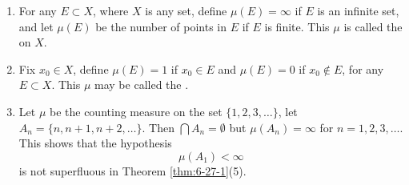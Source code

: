 \documentclass[../main.tex]{subfiles}
\begin{document}
\begin{example}{}{}
    \begin{enumerate}
\item For any $E \subset X$, where $X$ is any set, define $\mu(E) = \infty$ if $E$ is an infinite set, and let $\mu(E)$ be the number of points in $E$ if $E$ is finite. This $\mu$ is called the  on $X$.
\item Fix $x_0 \in X$, define $\mu(E) = 1$ if $x_0 \in E$ and $\mu(E) = 0$ if $x_0 \notin E$, for any $E \subset X$. This $\mu$ may be called the .
\item Let $\mu$ be the counting measure on the set $\{1, 2, 3, \dots\}$, let $A_n = \{n, n + 1, n + 2, \dots\}$. Then $\bigcap A_n = \emptyset$ but $\mu(A_n) = \infty$ for $n = 1, 2, 3, \dots$. This shows that the hypothesis
\[ \mu(A_1) < \infty \]
is not superfluous in Theorem \ref{thm:6-27-1}(5).
\end{enumerate}
\end{example}
\end{document}
